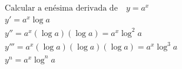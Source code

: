 \begin{ex}
\begin{align}
&\text{Calcular a enésima derivada de}\quad y=a^{x}\nonumber\\
&y'=a^{x}\log{a}\nonumber\\
&y''=a^{x}(\log{a})(\log{a})=a^{x}\log^2{a}\nonumber\\
&y'''=a^{x}(\log{a})(\log{a})(\log{a})=a^{x}\log^3{a}\nonumber\\
&y^{n}=a^{x}\log^{n}{a}\nonumber
\end{align}
\end{ex}